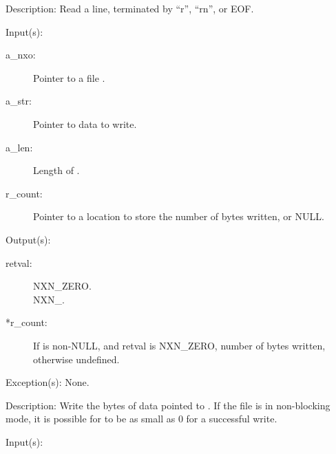 \begin{capi}
\begin{capilist}
\begin{description}
		\end{description}
	\item[Description: ]
		Read a line, terminated by ``{\bs}r'', ``{\bs}r{\bs}n'', or EOF.
	\end{capilist}
\label{nxo_file_write}
	\begin{capilist}
	\item[Input(s): ]
		\begin{description}\item[]
		\item[a\_nxo: ]
			Pointer to a file .
		\item[a\_str: ]
			Pointer to data to write.
		\item[a\_len: ]
			Length of .
		\item[r\_count: ]
			Pointer to a location to store the number of bytes
			written, or NULL.
		\end{description}
	\item[Output(s): ]
		\begin{description}\item[]
		\item[retval: ]
			\begin{description}\item[]
			\item[NXN\_ZERO.]
			\item[NXN\_.]
			\end{description}
		\item[*r\_count: ]
			If  is non-NULL, and retval is NXN\_ZERO,
			number of bytes written, otherwise undefined.
		\end{description}
	\item[Exception(s): ] None.
	\item[Description: ]
		Write the  bytes of data pointed to .
		If the file is in non-blocking mode, it is possible for
		 to be as small as 0 for a successful write.
	\end{capilist}
\label{nxo_file_truncate}
	\begin{capilist}
	\item[Input(s): ]
		\begin{description}\item[]

\end{description}
\end{capilist}
\end{capi}
